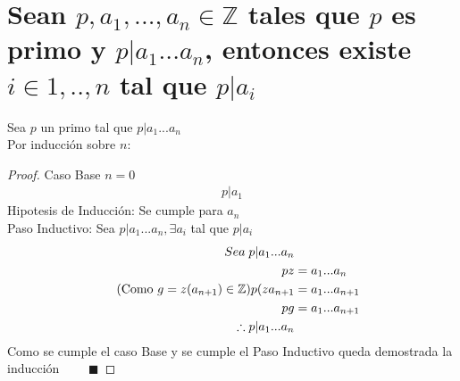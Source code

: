\section{Sean $p,a_1, ...,a_n \in \mathbb{Z} $ tales que $p $ es primo y $p | a_1...a_n $, entonces existe $i \in {1, ..,n} $ tal que $p | a_i $}
    Sea $p $ un primo tal que $ p | a_1...a_n $ \\
    Por inducción sobre $ n $:
    \begin{proof}
        Caso Base $ n = 0 $
        \begin{align}
            \tag{Es inmediato} p | a_1
        \end{align}
        Hipotesis de Inducción: Se cumple para $ a_n $ \\ 
        Paso Inductivo: Sea $ p | a_1...a_n, \exists a_i$ tal que $ p|a_i $ 
        \begin{align}
            \notag Sea \; p|a_1...a_n \\
            \notag pz &= a_1...a_n \\
            \tag{Como $ g=z(a_{n+1}) \in \mathbb{Z} $} p(za_{n+1} &= a_1...a_{n+1} \\
            \notag pg &= a_1...a_{n+1} \\ 
            \notag \therefore p|a_1...a_n
        \end{align}
        Como se cumple el caso Base y se cumple el Paso Inductivo queda demostrada la inducción $\qquad \blacksquare$
    \end{proof}